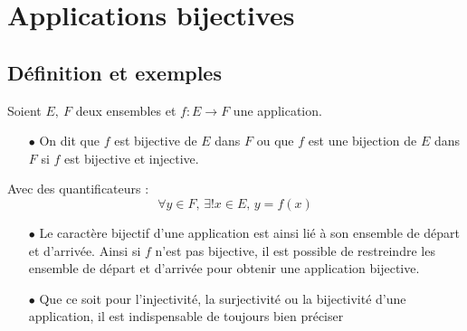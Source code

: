 \documentclass[a4paper, 11pt]{article}
\begin{document}
\section{Applications bijectives}

\subsection{D\'efinition et exemples}




\begin{defi} Soient $E,\ F$ deux ensembles et $f: E\rightarrow F$ une application.
	\begin{itemize}
		\item[$\bullet$] On dit que $f$ est bijective de $E$ dans $F$ ou que $f$ est une bijection de $E$ dans $F$ si $f$ est bijective et injective.
	\end{itemize}
\end{defi}


Avec des quantificateurs :
$$\forall  y \in F, \, \exists ! x\in E, \,  y=f(x)$$





\begin{rems}
	\begin{itemize}
		\item[$\bullet$] Le caract\`{e}re bijectif d'une application est ainsi li\'e \`{a} son ensemble de d\'epart et d'arriv\'ee. Ainsi si $f$ n'est pas bijective, il est possible de restreindre les ensemble de d\'epart et d'arriv\'ee pour obtenir une application bijective.
		\item[$\bullet$] \noindent \warning  Que ce soit pour l'injectivit\'e, la surjectivit\'e ou la bijectivit\'e d'une application, il est indispensable de toujours bien pr\'eciser \dotfill
	\end{itemize}
\end{rems}

%
\end{document}
